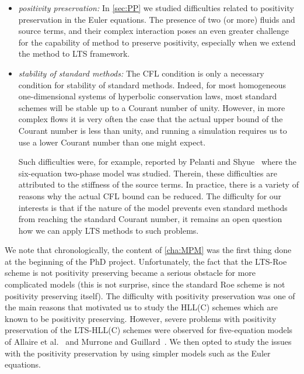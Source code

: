 {\begin{itemize}
\item \textit{positivity preservation:} In \cref{sec:PP} we studied difficulties related to positivity preservation in the Euler equations. The presence of two (or more) fluids and source terms, and their complex interaction poses an even greater challenge for the capability of method to preserve positivity, especially when we extend the method to LTS framework.

\item \textit{stability of standard methods:} The CFL condition is only a necessary condition for stability of standard methods. Indeed, for most homogeneous one-dimensional systems of hyperbolic conservation laws, most standard schemes will be stable up to a Courant number of unity. However, in more complex flows it is very often the case that the actual upper bound of the Courant number is less than unity, and running a simulation requires us to use a lower Courant number than one might expect.

Such difficulties were, for example, reported by Pelanti and Shyue~\cite{pel14} where the six-equation two-phase model was studied. Therein, these difficulties are attributed to the stiffness of the source terms. In practice, there is a variety of reasons why the actual CFL bound can be reduced. The difficulty for our interests is that if the nature of the model prevents even standard methods from reaching the standard Courant number, it remains an open question how we can apply LTS methods to such problems.
\end{itemize}

\begin{remark}
\normalfont
We note that chronologically, the content of \cref{cha:MPM} was the first thing done at the beginning of the PhD project. Unfortunately, the fact that the LTS-Roe scheme is not positivity preserving became a serious obstacle for more complicated models (this is not surprise, since the standard Roe scheme is not positivity preserving itself). The difficulty with positivity preservation was one of the main reasons that motivated us to study the HLL(C) schemes which are known to be positivity preserving. However, severe problems with positivity preservation of the LTS-HLL(C) schemes were observed for five-equation models of Allaire et al.~\cite{all02} and Murrone and Guillard~\cite{mur05}. We then opted to study the issues with the positivity preservation by using simpler models such as the Euler equations.
\end{remark}

}
